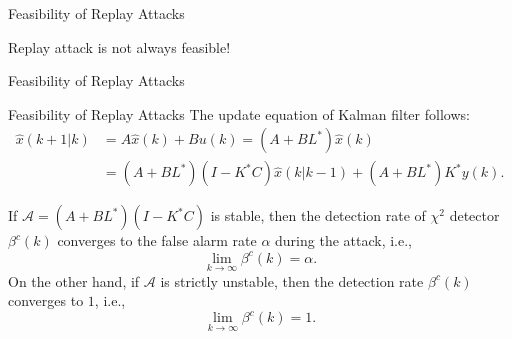 \documentclass[10pt]{beamer}
\newlength\figureheight
\newlength\figurewidth
\newcommand{\tikzdir}[1]{#1.tikz}
\newcommand{\inputtikz}[1]{}}
\begin{document}
\begin{frame}{Feasibility of Replay Attacks}
  \begin{figure}[htpb]
    \setlength\figureheight{4.5cm}
    \setlength\figurewidth{10cm}
    \begin{center}
      \inputtikz{replayunstableA2}
    \end{center}
  \end{figure}
  Replay attack is not always feasible!
\end{frame}

\begin{frame}{Feasibility of Replay Attacks}
  \begin{figure}[htpb]
    \begin{center}
      \inputtikz{replaydiagramthree}
    \end{center}
  \end{figure}
\end{frame}

\begin{frame}{Feasibility of Replay Attacks}
  The update equation of Kalman filter follows:
  \begin{align*}
    \hat{x}(k+1|k)&=A\hat{x}(k)+Bu(k)=\left(A+BL^*\right)\hat{x}(k)\\
		  &=\left(A+BL^*\right)\left(I-K^*C\right)\hat{x}(k|k-1)+\left(A+BL^*\right)K^*y(k).
  \end{align*}

  \begin{theorem}
    If $\mathcal A = (A+BL^*)(I-K^*C)$ is stable, then the detection rate of $\chi^2$ detector $\beta^c(k)$ converges to the false alarm rate $\alpha$ during the attack, i.e.,
    \begin{displaymath}
      \lim_{k\rightarrow\infty}\beta^c(k) = \alpha.  
    \end{displaymath}
    On the other hand, if $\mathcal A$ is strictly unstable, then the detection rate $\beta^c(k)$ converges to $1$, i.e.,
    \begin{displaymath}
      \lim_{k\rightarrow\infty}\beta^c(k) = 1.  
    \end{displaymath}
  \end{theorem}
\end{frame}
\end{document}
